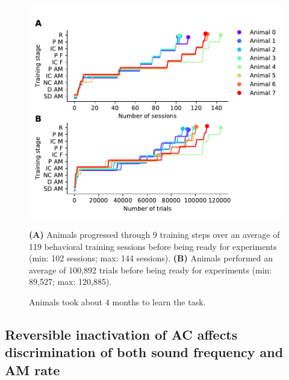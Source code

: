 \begin{figure}[hp] \begin{center}
	\includegraphics[width=6in]{figures/chapter4/figure_training}%
\end{center} \caption{Animals took about 4 months to learn the
task.}{\textbf{(A)} Animals progressed through 9 training steps over an average
of 119 behavioral training sessions before being ready for experiments (min:
102 sessions; max: 144 sessions). 
%
\textbf{(B)} Animals performed an average of 100,892 trials before being ready
for experiments (min: 89,527; max: 120,885). 
%
} \end{figure}

\subsection{Reversible inactivation of AC affects discrimination of both sound
frequency and AM rate}

